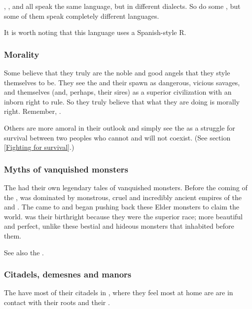 \Mystraacht, \CiriathSepher, \TiphredSerah{} and \Kezerad{} all speak the same language, but in different dialects. 
So do some \Baelzerach, but some of them speak completely different languages. 

It is worth noting that this language uses a Spanish-style  R. 





\subsubsection{Morality}
Some \resphain{} believe that they truly are the noble and good angels that they style themselves to be. They see the \dragons{} and their spawn as dangerous, vicious savages, and themselves (and, perhaps, their \SitraAchra sires) as a superior civilization with an inborn right to rule. So they truly believe that what they are doing is morally right. Remember, .

Others are more amoral in their outlook and simply see the \secretwar{} as a struggle for survival between two peoples who cannot and will not coexist. (See section \ref{Fighting for survival}.)





\subsubsection{Myths of vanquished monsters}
The \resphain had their own legendary tales of vanquished monsters. 
Before the coming of the \resphain, \Miith was dominated by monstrous, cruel and incredibly ancient empires of the \dragons and \ophidians. 
The \resphain came to \Miith and began pushing back these Elder monsters to claim the world.
\Miith was their birthright because they were the superior race; more beautiful and perfect, unlike these bestial and hideous monsters that inhabited \Miith before them. 

See also the . 





\subsubsection{Citadels, demesnes and manors}
The \resphain{} have most of their citadels in , where they feel most at home are are in contact with their roots and their . 

